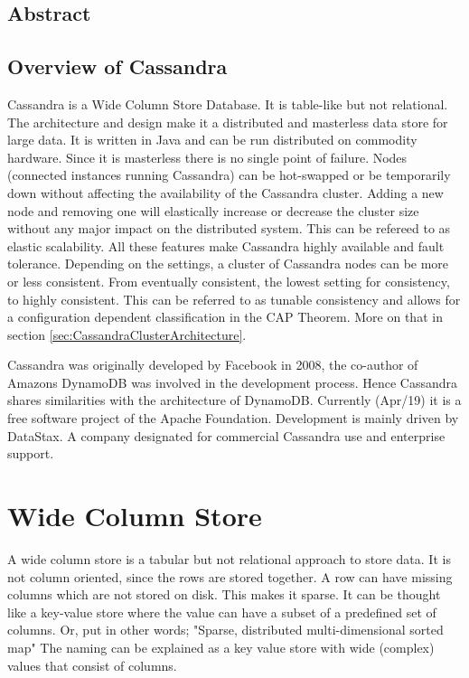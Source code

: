 \subsection{Abstract}
\subsection{Overview of Cassandra}
Cassandra is a Wide Column Store Database. It is table-like but not relational. The architecture and design make it a distributed and masterless data store for large data. It is written in Java and can be run distributed on commodity hardware. Since it is masterless there is no single point of failure. Nodes (connected instances running Cassandra) can be hot-swapped or be temporarily down without affecting the availability of the Cassandra cluster. Adding a new node and removing one will elastically increase or decrease the cluster size without any major impact on the distributed system. This can be refereed to as elastic scalability. All these features make Cassandra highly available and fault tolerance. Depending on the settings, a cluster of Cassandra nodes can be more or less consistent. From eventually consistent, the lowest setting for consistency, to highly consistent. This can be referred to as tunable consistency and allows for a configuration dependent classification in the CAP Theorem. More on that in section \ref{sec:CassandraClusterArchitecture}.

Cassandra was originally developed by Facebook in 2008, the co-author of Amazons DynamoDB was involved in the development process. Hence Cassandra shares similarities with the architecture of DynamoDB.
Currently (Apr/19) it is a free software project of the Apache Foundation. Development is mainly driven by DataStax. A company designated for commercial Cassandra use and enterprise support.

\section{Wide Column Store}

A wide column store is a tabular but not relational approach to store data. It is not column oriented, since the rows are stored together. A row can have missing columns which are not stored on disk. This makes it sparse.
It can be thought like a key-value store where the value can have a subset of a predefined set of columns. Or, put in other words; "Sparse, distributed multi-dimensional sorted map" \cite{chang2008bigtable}
The naming can be explained as a key value store with wide (complex) values that consist of columns.

